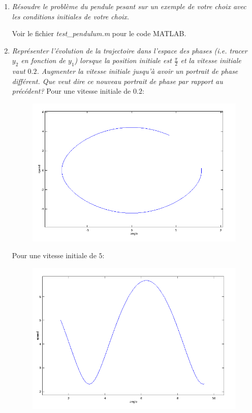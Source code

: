 \documentclass[a4paper,10pt]{article}
\begin{document}
\begin{enumerate}
    \item \emph{Résoudre le problème du pendule pesant sur un exemple de votre choix
    avec les conditions initiales de votre choix.}

    Voir le fichier \emph{test\_pendulum.m} pour le code MATLAB.

    \item \emph{Représenter l'évolution de la trajectoire dans l'espace des phases (i.e.
    tracer $y_2$ en fonction de $y_1$) lorsque la position initiale est
    $\frac{\pi}{2}$ et la vitesse initiale vaut $0.2$. Augmenter la vitesse initiale
    jusqu'à avoir un portrait de phase différent. Que veut dire ce nouveau portrait
    de phase par rapport au précédent?}
\clearpage
    Pour une vitesse initiale de $0.2$:
\begin{figure}[h!]
    \centering
    \includegraphics[scale=0.5]{./img/pendulum-phase1.png}
\end{figure}

    Pour une vitesse initiale de $5$:
\begin{figure}[h!]
    \centering
    \includegraphics[scale=0.5]{./img/pendulum-phase.png}
\end{figure}


\end{enumerate}
\end{document}
